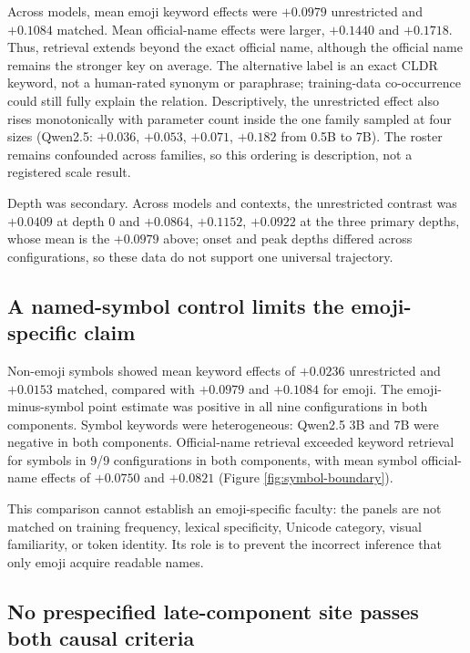\documentclass{article}
\begin{document}
Across models, mean emoji keyword effects were $+0.0979$ unrestricted and
$+0.1084$ matched. Mean official-name effects were larger, $+0.1440$ and
$+0.1718$. Thus, retrieval extends beyond the exact official name, although
the official name remains the stronger key on average. The alternative label
is an exact CLDR keyword, not a human-rated synonym or paraphrase;
training-data co-occurrence could still fully explain the relation.
Descriptively, the unrestricted effect also rises monotonically with
parameter count inside the one family sampled at four sizes (Qwen2.5:
$+0.036$, $+0.053$, $+0.071$, $+0.182$ from 0.5B to 7B). The roster remains
confounded across families, so this ordering is description, not a registered
scale result.

Depth was secondary. Across models and contexts, the unrestricted contrast
was $+0.0409$ at depth 0 and $+0.0864$, $+0.1152$, $+0.0922$ at the three
primary depths, whose mean is the $+0.0979$ above; onset and peak depths
differed across configurations, so these data do not support one universal
trajectory.

\subsection{A named-symbol control limits the emoji-specific claim}

Non-emoji symbols showed mean keyword effects of $+0.0236$ unrestricted and
$+0.0153$ matched, compared with $+0.0979$ and $+0.1084$ for emoji. The
emoji-minus-symbol point estimate was positive in all nine configurations in both
components. Symbol keywords were heterogeneous: Qwen2.5 3B and 7B were
negative in both components. Official-name retrieval exceeded keyword retrieval
for symbols in 9/9 configurations in both components, with mean symbol official-name effects
of $+0.0750$ and $+0.0821$ (Figure \ref{fig:symbol-boundary}).

This comparison cannot establish an emoji-specific faculty: the panels are
not matched on training frequency, lexical specificity, Unicode category,
visual familiarity, or token identity. Its role is to prevent the incorrect
inference that only emoji acquire readable names.

\subsection{No prespecified late-component site passes both causal criteria}
\end{document}
